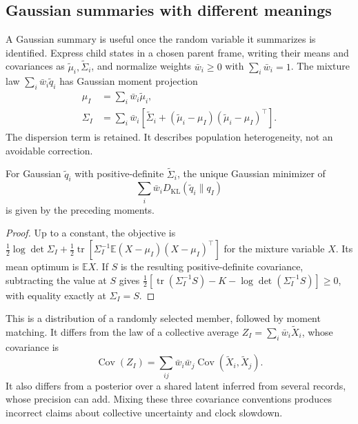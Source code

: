 \subsection{Gaussian summaries with different meanings}\label{sec:meta_agent_state_construction}
A Gaussian summary is useful once the random variable it summarizes is identified. Express child states in a chosen parent frame, writing their means and covariances as $\tilde\mu_i,\tilde\Sigma_i$, and normalize weights $\bar w_i\geq0$ with $\sum_i\bar w_i=1$. The mixture law $\sum_i\bar w_i\tilde q_i$ has Gaussian moment projection
\begin{align}
\mu_I&=\sum_i\bar w_i\tilde\mu_i,\label{eq:meta_agent_mu_barycenter}\\
\Sigma_I&=\sum_i\bar w_i\left[\tilde\Sigma_i+
(\tilde\mu_i-\mu_I)(\tilde\mu_i-\mu_I)^\top\right].
\label{eq:meta_agent_sigma_barycenter}\end{align}
The dispersion term is retained. It describes population heterogeneity, not an avoidable correction.

\begin{proposition}\label{prop:barycenter_existence}
For Gaussian $\tilde q_i$ with positive-definite $\tilde\Sigma_i$, the unique Gaussian minimizer of
\begin{equation}
\sum_i\bar w_iD_{\mathrm{KL}}(\tilde q_i\|q_I)
\label{eq:meta_agent_barycenter}
\end{equation}
is given by the preceding moments.
\end{proposition}
\begin{proof}
Up to a constant, the objective is
$\tfrac12\log\det\Sigma_I+
\tfrac12\operatorname{tr}[\Sigma_I^{-1}\mathbb E(X-\mu_I)(X-\mu_I)^\top]$
for the mixture variable $X$. Its mean optimum is $\mathbb EX$. If $S$ is the resulting positive-definite covariance, subtracting the value at $S$ gives
$\tfrac12[\operatorname{tr}(\Sigma_I^{-1}S)-K-\log\det(\Sigma_I^{-1}S)]\geq0$,
with equality exactly at $\Sigma_I=S$.
\end{proof}
This is a distribution of a randomly selected member, followed by moment matching. It differs from the law of a collective average $Z_I=\sum_i\bar w_i\tilde X_i$, whose covariance is
\begin{equation}
\operatorname{Cov}(Z_I)=\sum_{ij}\bar w_i\bar w_j
\operatorname{Cov}(\tilde X_i,\tilde X_j).
\label{eq:parent_average_covariance}
\end{equation}
It also differs from a posterior over a shared latent inferred from several records, whose precision can add. Mixing these three covariance conventions produces incorrect claims about collective uncertainty and clock slowdown.

